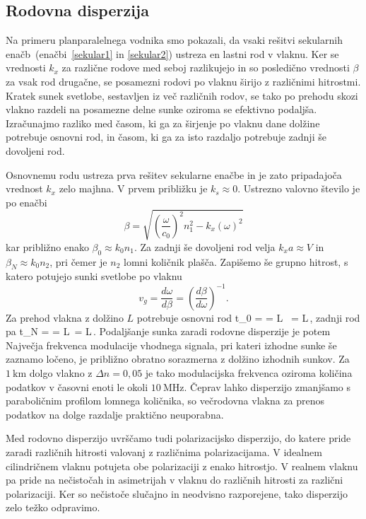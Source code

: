 \subsection*{Rodovna disperzija}
Na primeru planparalelnega vodnika smo pokazali, da vsaki rešitvi sekularnih 
enačb~(enačbi~\ref{sekular1} in \ref{sekular2}) ustreza en lastni rod v vlaknu.
Ker se vrednosti $k_x$ za različne rodove med seboj razlikujejo in so posledično vrednosti $\beta$ za 
vsak rod drugačne, se posamezni rodovi po vlaknu širijo z različnimi hitrostmi. Kratek
sunek svetlobe, sestavljen iz več različnih rodov, se tako po prehodu skozi vlakno
razdeli na posamezne delne sunke oziroma se efektivno podaljša. 
Izračunajmo razliko med časom, ki ga za širjenje po vlaknu dane dolžine 
potrebuje osnovni rod, in časom, ki ga za isto razdaljo potrebuje zadnji še dovoljeni rod.
 
Osnovnemu rodu ustreza prva rešitev sekularne enačbe in je zato pripadajoča 
vrednost $k_x$ zelo majhna. V prvem približku je $k_s \approx 0$. Ustrezno valovno 
število je po enačbi
\begin{equation}
\beta = \sqrt{\left( \frac{\omega}{c_0}\right)^2n_1^2 - k_x(\omega)^2}
\label{nelinfib}
\end{equation}
kar približno enako $\beta_0 \approx k_0 n_1$. 
Za zadnji še dovoljeni rod velja $k_xa \approx V$ in $\beta_N \approx k_0 n_2$, pri čemer je
$n_2$ lomni količnik plašča. Zapišemo še grupno hitrost, s katero potujejo sunki 
svetlobe po vlaknu
\begin{equation}
v_{g}=\frac{d\omega}{d\beta}=\left(\frac{d\beta}{d\omega}\right)^{-1}.
\label{9.51}
\end{equation}
Za prehod vlakna z dolžino $L$ potrebuje osnovni rod
\beq
t_0 =  =  L \, = L\,,
\eeq
zadnji rod pa 
\beq
t_N =  = L\,  = L\,.
\eeq
Podaljšanje sunka zaradi rodovne disperzije je potem 
Največja frekvenca modulacije vhodnega signala, pri kateri izhodne sunke še zaznamo ločeno,
je približno obratno sorazmerna z dolžino izhodnih sunkov. Za $1~\si{\kilo\meter}$ dolgo vlakno z 
$\Delta n = 0,05$  je tako modulacijska frekvenca oziroma količina podatkov v časovni
enoti le 
okoli $10~\si{\mega\hertz}$. Čeprav lahko disperzijo zmanjšamo 
s paraboličnim profilom lomnega količnika, so večrodovna vlakna za prenos podatkov na dolge 
razdalje praktično neuporabna.
\begin{remark}
 Med rodovno disperzijo uvrščamo tudi polarizacijsko disperzijo, 
 do katere pride zaradi različnih hitrosti valovanj z različnima polarizacijama. 
 V idealnem cilindričnem vlaknu potujeta obe polarizaciji
 z enako hitrostjo. V realnem vlaknu pa 
 pride na nečistočah in asimetrijah v vlaknu do različnih hitrosti za različni polarizaciji. 
 Ker so nečistoče slučajno in neodvisno razporejene, tako disperzijo zelo težko odpravimo.
\end{remark}

